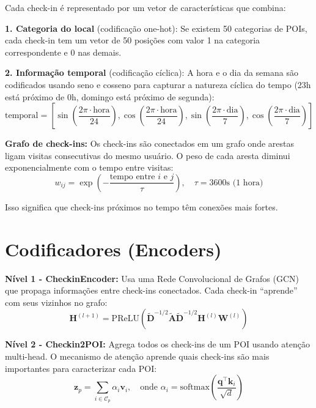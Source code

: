 \documentclass[a4paper,11pt]{article}
\begin{document}
Cada check-in é representado por um vetor de características que combina:

\textbf{1. Categoria do local} (codificação one-hot): Se existem 50 categorias de POIs, cada check-in tem um vetor de 50 posições com valor 1 na categoria correspondente e 0 nas demais.

\textbf{2. Informação temporal} (codificação cíclica): A hora e o dia da semana são codificados usando seno e cosseno para capturar a natureza cíclica do tempo (23h está próximo de 0h, domingo está próximo de segunda):
\begin{equation*}
\text{temporal} = \left[\sin\left(\frac{2\pi \cdot \text{hora}}{24}\right), \cos\left(\frac{2\pi \cdot \text{hora}}{24}\right), \sin\left(\frac{2\pi \cdot \text{dia}}{7}\right), \cos\left(\frac{2\pi \cdot \text{dia}}{7}\right)\right]
\end{equation*}

\textbf{Grafo de check-ins:} Os check-ins são conectados em um grafo onde arestas ligam visitas consecutivas do mesmo usuário. O peso de cada aresta diminui exponencialmente com o tempo entre visitas:
\begin{equation*}
w_{ij} = \exp\left(-\frac{\text{tempo entre } i \text{ e } j}{\tau}\right), \quad \tau = 3600\text{s (1 hora)}
\end{equation*}

Isso significa que check-ins próximos no tempo têm conexões mais fortes.

\section{Codificadores (Encoders)}

\textbf{Nível 1 - CheckinEncoder:} Usa uma Rede Convolucional de Grafos (GCN) que propaga informações entre check-ins conectados. Cada check-in ``aprende'' com seus vizinhos no grafo:
\begin{equation*}
\mathbf{H}^{(l+1)} = \text{PReLU}\left(\tilde{\mathbf{D}}^{-1/2}\tilde{\mathbf{A}}\tilde{\mathbf{D}}^{-1/2}\mathbf{H}^{(l)}\mathbf{W}^{(l)}\right)
\end{equation*}

\textbf{Nível 2 - Checkin2POI:} Agrega todos os check-ins de um POI usando atenção multi-head. O mecanismo de atenção aprende quais check-ins são mais importantes para caracterizar cada POI:
\begin{equation*}
\mathbf{z}_p = \sum_{i \in \mathcal{C}_p} \alpha_i \mathbf{v}_i, \quad \text{onde } \alpha_i = \text{softmax}\left(\frac{\mathbf{q}^\top \mathbf{k}_i}{\sqrt{d}}\right)
\end{equation*}
\end{document}
